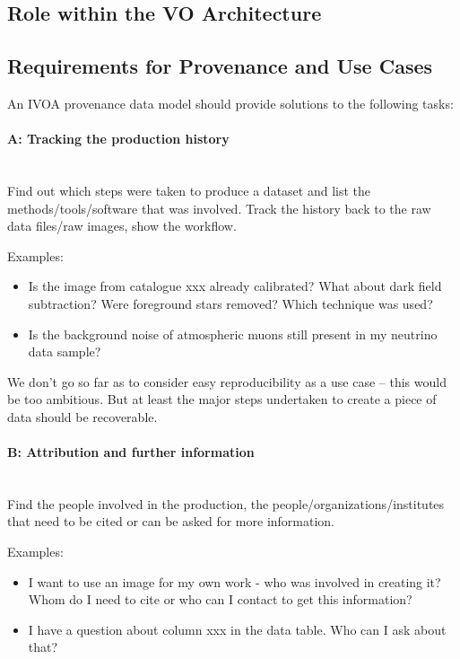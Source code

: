 \documentclass[11pt,a4paper]{ivoa}
\newcommand{\paragraphlb}[1]{\paragraph{#1}\mbox{}\\} %
\begin{document}
\subsection{Role within the VO Architecture}





\subsection{Requirements for Provenance and Use Cases}

An IVOA provenance data model should provide solutions to the following tasks:

\paragraphlb{A: Tracking the production history}
		Find out which steps were taken to produce a dataset and list the methods/tools/software that was involved. 
		Track the history back to the raw data files/raw images, show the workflow.

		\noindent Examples: 
		\begin{itemize}
			\item Is the image from catalogue xxx already calibrated?
What about dark field subtraction? Were foreground stars removed? Which technique
was used?  
			
			\item Is the background noise of atmospheric muons still present in my neutrino data sample?  
		\end{itemize}

		We don't go so far as to consider easy reproducibility as a use case -- this would be too ambitious. But at least the 
		major steps undertaken to create a piece of data should be recoverable.

	  
\paragraphlb{B: Attribution and further information}
		Find the people involved in the production, the people/organizations/institutes that need to be cited or can be asked for more information.

		\noindent Examples: 
		\begin{itemize}
			\item I want to use an image for my own work - who was involved in
creating it? Whom do I need to cite or who can I contact to get this information?  
			\item I have a question about column xxx in the data
table. Who can I ask about that?  
		\end{itemize}
	  
\end{document}
